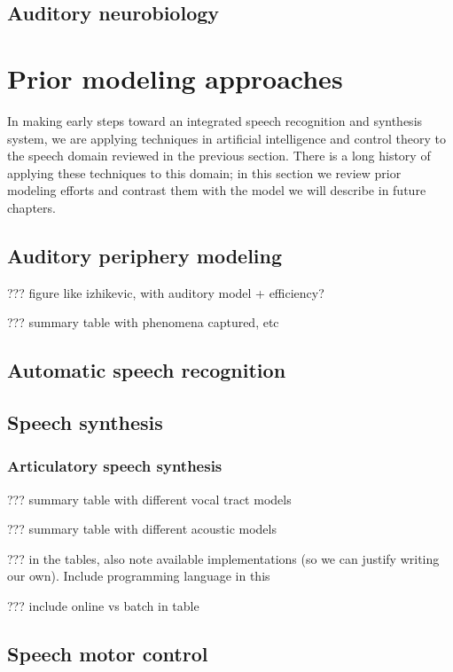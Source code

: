 \subsection{Auditory neurobiology}

\section{Prior modeling approaches}

In making early steps toward
an integrated speech recognition and synthesis system,
we are applying techniques
in artificial intelligence and control theory
to the speech domain reviewed in the previous section.
There is a long history of applying these techniques
to this domain;
in this section we review prior modeling efforts
and contrast them with the model we will describe
in future chapters.

\subsection{Auditory periphery modeling}

??? figure like izhikevic, with auditory model + efficiency?

??? summary table with phenomena captured, etc

\subsection{Automatic speech recognition}

\subsection{Speech synthesis}

\subsubsection{Articulatory speech synthesis}

??? summary table with different vocal tract models

??? summary table with different acoustic models

??? in the tables, also note available implementations
(so we can justify writing our own).
Include programming language in this

??? include online vs batch in table

\subsection{Speech motor control}

